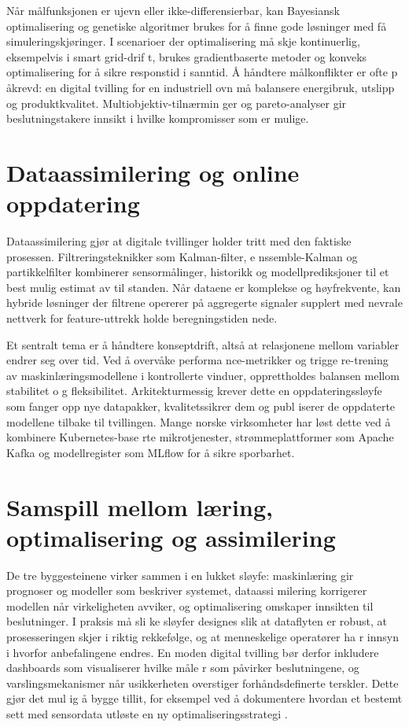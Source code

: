 Når målfunksjonen er ujevn eller ikke-differensierbar, kan Bayesiansk optimalisering og genetiske algoritmer brukes for å finne
gode løsninger med få simuleringskjøringer. I scenarioer der optimalisering må skje kontinuerlig, eksempelvis i smart grid-drif
t, brukes gradientbaserte metoder og konveks optimalisering for å sikre responstid i sanntid. Å håndtere målkonflikter er ofte p
åkrevd: en digital tvilling for en industriell ovn må balansere energibruk, utslipp og produktkvalitet. Multiobjektiv-tilnærmin
ger og pareto-analyser gir beslutningstakere innsikt i hvilke kompromisser som er mulige.

\section{Dataassimilering og online oppdatering}
Dataassimilering gjør at digitale tvillinger holder tritt med den faktiske prosessen. Filtreringsteknikker som Kalman-filter, e
nssemble-Kalman og partikkelfilter kombinerer sensormålinger, historikk og modellprediksjoner til et best mulig estimat av til
standen. Når dataene er komplekse og høyfrekvente, kan hybride løsninger der filtrene opererer på aggregerte signaler supplert
med nevrale nettverk for feature-uttrekk holde beregningstiden nede.

Et sentralt tema er å håndtere konseptdrift, altså at relasjonene mellom variabler endrer seg over tid. Ved å overvåke performa
nce-metrikker og trigge re-trening av maskinlæringsmodellene i kontrollerte vinduer, opprettholdes balansen mellom stabilitet o
g fleksibilitet. Arkitekturmessig krever dette en oppdateringssløyfe som fanger opp nye datapakker, kvalitetssikrer dem og publ
iserer de oppdaterte modellene tilbake til tvillingen. Mange norske virksomheter har løst dette ved å kombinere Kubernetes-base
rte mikrotjenester, strømmeplattformer som Apache Kafka og modellregister som MLflow for å sikre sporbarhet.

\section{Samspill mellom læring, optimalisering og assimilering}
De tre byggesteinene virker sammen i en lukket sløyfe: maskinlæring gir prognoser og modeller som beskriver systemet, dataassi
milering korrigerer modellen når virkeligheten avviker, og optimalisering omskaper innsikten til beslutninger. I praksis må sli
ke sløyfer designes slik at dataflyten er robust, at prosesseringen skjer i riktig rekkefølge, og at menneskelige operatører ha
r innsyn i hvorfor anbefalingene endres. En moden digital tvilling bør derfor inkludere dashboards som visualiserer hvilke måle
r som påvirker beslutningene, og varslingsmekanismer når usikkerheten overstiger forhåndsdefinerte terskler. Dette gjør det mul
ig å bygge tillit, for eksempel ved å dokumentere hvordan et bestemt sett med sensordata utløste en ny optimaliseringsstrategi
.

